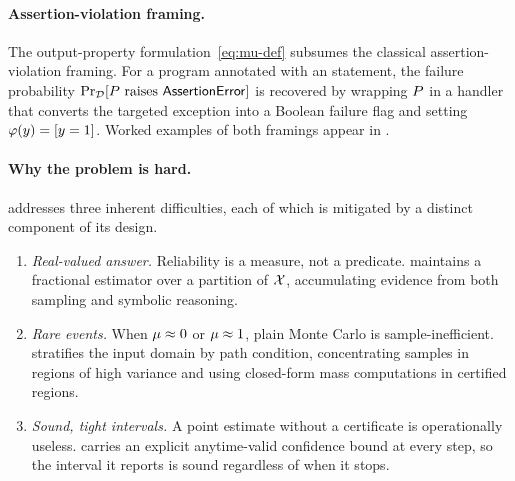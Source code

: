 \paragraph{Assertion-violation framing.}
The output-property formulation~\eqref{eq:mu-def} subsumes the
classical assertion-violation framing.  For a program annotated with
an  statement, the failure probability
$\Pr_{\mathcal{D}}[P\text{ raises }\mathsf{AssertionError}]$ is recovered
by wrapping $P$ in a handler that converts the targeted exception
into a Boolean failure flag and setting $\varphi(y) = [y = 1]$.
Worked examples of both framings appear in .

\paragraph{Why the problem is hard.}
\toolname{} addresses three inherent difficulties, each of which is
mitigated by a distinct component of its design.
\begin{enumerate}
\item \emph{Real-valued answer.}  Reliability is a measure, not a
  predicate.  \toolname{} maintains a fractional estimator over a
  partition of $\mathcal{X}$, accumulating evidence from both sampling and
  symbolic reasoning.
\item \emph{Rare events.}  When $\mu \approx 0$ or $\mu
  \approx 1$, plain Monte Carlo is sample-inefficient.  \toolname{}
  stratifies the input domain by path condition, concentrating samples
  in regions of high variance and using closed-form mass computations
  in certified regions.
\item \emph{Sound, tight intervals.}  A point estimate without a
  certificate is operationally useless.  \toolname{} carries an
  explicit anytime-valid confidence bound at every step, so the
  interval it reports is sound regardless of when it stops.
\end{enumerate}

